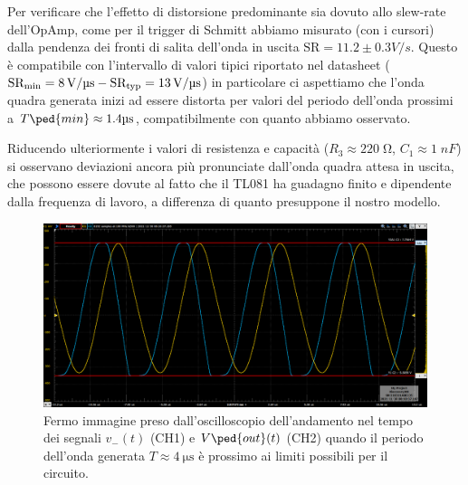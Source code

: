 \documentclass[10pt, a4paper, italian]{article}
\begin{document}
Per verificare che l'effetto di distorsione predominante sia dovuto allo
slew-rate dell'OpAmp, come per il trigger di Schmitt abbiamo misurato (con
i cursori) dalla pendenza dei fronti di salita dell'onda in uscita
$\mathrm{SR} = 11.2 \pm 0.3 \si{V/s}$. Questo è compatibile con l'intervallo
di valori tipici riportato nel datasheet
($\rm SR_{min} = \SI{8}{\V/\micro\s} - SR_{typ} = \SI{13}{\V/\micro\s}$)
in particolare ci aspettiamo che l'onda quadra generata inizi ad essere
distorta per valori del periodo dell'onda prossimi a
$T\ped{min} \approx 1.4 \si{\micro\s}$, compatibilmente con quanto abbiamo
osservato.

Riducendo ulteriormente i valori di resistenza e capacità
($R_3 \approx 220 \; \si{\ohm}$, $C_1 \approx 1 \; \si{nF}$) si osservano
deviazioni ancora più pronunciate dall'onda quadra attesa in uscita, che
possono essere dovute al fatto che il TL081 ha guadagno finito e dipendente
dalla frequenza di lavoro, a differenza di quanto presuppone il nostro modello. 
\begin{figure}[htbp]
\centering
\includegraphics[scale=0.45]{astable(C=1 nF, R= 220 ohm)}
\caption{Fermo immagine preso dall'oscilloscopio dell'andamento nel tempo dei
segnali $v_- (t)$ (CH1) e $V\ped{out} (t)$ (CH2) quando il periodo dell'onda
generata $T \approx \SI{4}{\micro\s}$ è prossimo ai limiti possibili per il
circuito. \label{fig: astable_lim}}
\end{figure}

\end{document}
